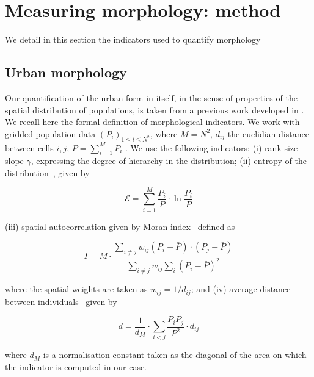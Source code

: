 \section{Measuring morphology: method}


We detail in this section the indicators used to quantify morphology


\subsection{Urban morphology}


Our quantification of the urban form in itself, in the sense of properties of the spatial distribution of populations, is taken from a previous work developed in \cite{2017arXiv170806743R}. We recall here the formal definition of morphological indicators. We work with gridded population data $(P_i)_{1\leq i \leq N^2}$, where $M=N^2$, $d_{ij}$  the euclidian distance between cells $i,j$,  $P=\sum_{i=1}^{M} P_i$ . We use the following indicators: (i) rank-size slope $\gamma$, expressing the degree of hierarchy in the distribution; (ii) entropy of the distribution~\citep{le2015forme}, given by 

\begin{equation}
\mathcal{E} = \sum_{i=1}^{M}\frac{P_i}{P}\cdot \ln{\frac{P_i}{P}}
\end{equation}
 
(iii) spatial-autocorrelation given by Moran index~\citep{tsai2005quantifying} defined as

\begin{equation}
I = M \cdot \frac{\sum_{i\neq j} w_{ij} \left(P_i - \bar{P}\right)\cdot\left(P_j - \bar{P}\right)}{\sum_{i\neq j} w_{ij} \sum_{i}{\left( P_i - \bar{P}\right)}^2}
\end{equation}

where the spatial weights are taken as $w_{ij} = 1/d_{ij}$; and (iv) average distance between individuals~\citep{le2009quantifier} given by

\begin{equation}
\bar{d} = \frac{1}{d_M}\cdot \sum_{i<j} \frac{P_i P_j}{P^2} \cdot d_{ij}
\end{equation}

where $d_M$ is a normalisation constant taken as the diagonal of the area on which the indicator is computed in our case.

